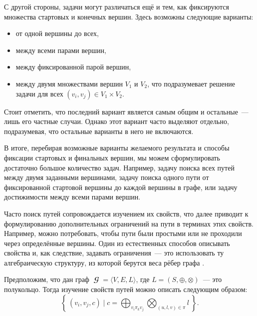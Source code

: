 С другой стороны, задачи могут различаться ещё и тем, как фиксируются множества стартовых и конечных вершин.
Здесь возможны следующие варианты:
\begin{itemize}
    \item от одной вершины до всех,
    \item между всеми парами вершин,
    \item между фиксированной парой вершин,
    \item между двумя множествами вершин $V_1$ и $V_2$, что подразумевает решение задачи для всех $(v_i,v_j) \in V_1 \times V_2$.
\end{itemize}

Стоит отметить, что последний вариант является самым общим и остальные~--- лишь его частные случаи.
Однако этот вариант часто выделяют отдельно, подразумевая, что остальные варианты в него не включаются.

В итоге, перебирая возможные варианты желаемого результата и способы фиксации стартовых и финальных вершин, мы можем сформулировать достаточно большое количество задач.
Например, задачу поиска всех путей между двумя заданными вершинами, задачу поиска одного пути от фиксированной стартовой вершины до каждой вершины в графе, или задачу достижимости между всеми парами вершин.

Часто поиск путей сопровождается изучением их свойств, что далее приводит к формулированию дополнительных ограничений на пути в терминах этих свойств.
Например, можно потребовать, чтобы пути были простыми или не проходили через определённые вершины.
Один из естественных способов описывать свойства и, как следствие, задавать ограничения~--- это использовать ту алгебраическую структуру, из которой берутся веса рёбер графа%
.

Предположим, что дан граф $\mbfscrG = \langle V, E, L\rangle $, где $L = (S, \oplus, \otimes)$~--- это полукольцо.
Тогда изучение свойств путей можно описать следующим образом:
\begin{equation}
    \label{eq:algPathProblem}
    \left\{\ (v_i, v_j, c) \mid c = \bigoplus_{v_i \pi_k v_j} \bigotimes_{(u, l, v) \in \pi } l \ \right\}.
\end{equation}

